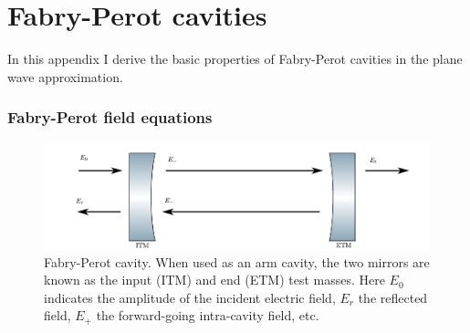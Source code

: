 \chapter{Fabry-Perot cavities}
\label{sec:cavities}
In this appendix I derive the basic properties of Fabry-Perot
cavities in the plane wave approximation.

\subsection{Fabry-Perot field equations}

\begin{figure}
\includegraphics[]{figures/cavity.pdf}
\caption[Fabry-Perot Cavity]{\label{fig:fabry-perot}Fabry-Perot
  cavity.  When used as an arm cavity, the two mirrors are known as
  the input (ITM) and end (ETM) test masses.  Here $E_0$ indicates the
  amplitude of the incident electric field, $E_r$ the reflected field,
  $E_+$ the forward-going intra-cavity field, etc.}
\end{figure}

